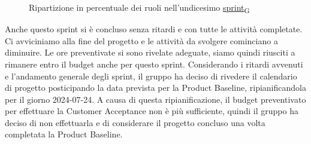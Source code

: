 \begin{figure}[!h]
    \centering
    \caption{Ripartizione in percentuale dei ruoli nell'undicesimo \href{https://7last.github.io/docs/pb/documentazione-interna/glossario\#sprint}{sprint\textsubscript{G}}}
\end{figure}

Anche questo sprint si è concluso senza ritardi e con tutte le attività completate. Ci avviciniamo alla fine del progetto e le attività da svolgere cominciano a diminuire. Le ore preventivate si sono rivelate adeguate, siamo quindi riusciti a rimanere entro il budget anche per questo sprint. 
Considerando i ritardi avvenuti e l'andamento generale degli sprint, il gruppo ha deciso di rivedere il calendario di progetto posticipando la data prevista per la Product Baseline, ripianificandola per il giorno 2024-07-24. A causa di questa ripianificazione, il budget preventivato per effettuare la Customer Acceptance non è più sufficiente, quindi il gruppo ha deciso di non effettuarla e di considerare il progetto concluso una volta completata la Product Baseline.

